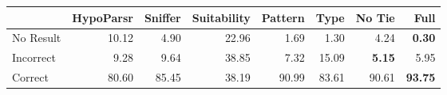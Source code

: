 \begin{tabular}{lrrr|rrrr}
 & HypoParsr & Sniffer & Suitability & Pattern & Type & No Tie & Full\\
\hline
No Result & 10.12 & 4.90 & 22.96 & 1.69 & 1.30 & 4.24 & \textbf{0.30}\\
Incorrect & 9.28 & 9.64 & 38.85 & 7.32 & 15.09 & \textbf{5.15} & 5.95\\
Correct & 80.60 & 85.45 & 38.19 & 90.99 & 83.61 & 90.61 & \textbf{93.75}\\
\hline
\end{tabular}
